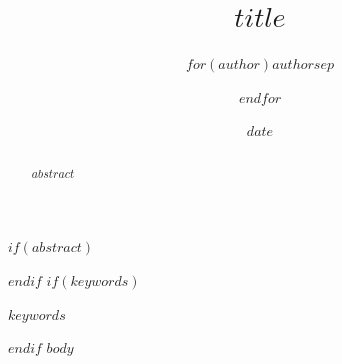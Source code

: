 \documentclass[conference]{IEEEtran}
\title{$title$}
\author{$for(author)$$author$$sep$ \and $endfor$}
\date{$date$}
\date{}
\begin{document}
\maketitle
$if(abstract)$
\begin{abstract}
$abstract$
\end{abstract}
$endif$
$if(keywords)$
\begin{IEEEkeywords}
$keywords$
\end{IEEEkeywords}
$endif$
$body$
\end{document}
